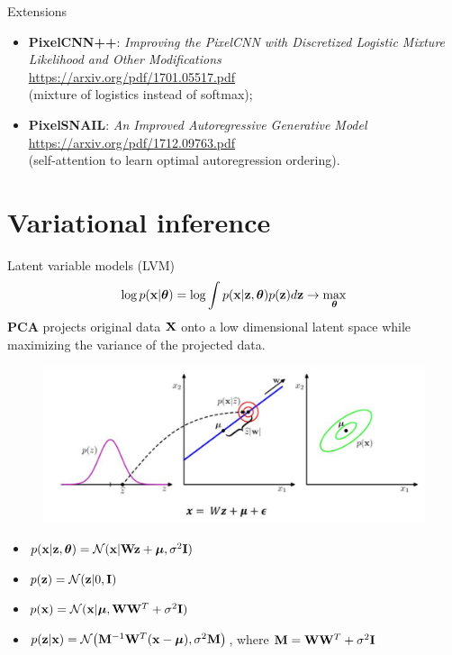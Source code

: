 \documentclass{beamer}
\begin{document}
\begin{frame}{Extensions}
\begin{itemize}
	\item \textbf{PixelCNN++}: \textit{Improving the PixelCNN with Discretized Logistic Mixture Likelihood and Other Modifications} \\
	\href{https://arxiv.org/pdf/1701.05517.pdf}{https://arxiv.org/pdf/1701.05517.pdf} \\
	(mixture of logistics instead of softmax);
	\item \textbf{PixelSNAIL}: \textit{An Improved Autoregressive Generative Model} \\
	\href{https://arxiv.org/pdf/1712.09763.pdf}{https://arxiv.org/pdf/1712.09763.pdf} \\
	(self-attention to learn optimal autoregression ordering).
\end{itemize}
\end{frame}
\section{Variational inference}
\begin{frame}{Latent variable models (LVM)}
	\[
	\log p(\mathbf{x} | \boldsymbol{\theta}) = \log \int p(\mathbf{x} | \mathbf{z}, \boldsymbol{\theta}) p(\mathbf{z}) d\mathbf{z} \rightarrow \max_{\boldsymbol{\theta}}
	\]
	\textbf{PCA} projects original data $\mathbf{X}$ onto a low dimensional latent space while maximizing the variance of the projected data. 
	\begin{figure}
		\centering
		\includegraphics[width=.7\linewidth]{figs/bayesian_pca}
	\end{figure}
	\vspace{-0.5cm}
	\begin{itemize}
		\item $p(\mathbf{x} | \mathbf{z}, \boldsymbol{\theta}) = \mathcal{N}(\mathbf{x} | \mathbf{W} \mathbf{z} + \boldsymbol{\mu}, \sigma^2 \mathbf{I})$
		\item $p(\mathbf{z}) = \mathcal{N}(\mathbf{z} | 0, \mathbf{I})$
		\item $p(\mathbf{x}) = \mathcal{N}(\mathbf{x} | \boldsymbol{\mu}, \mathbf{W} \mathbf{W}^T + \sigma^2 \mathbf{I})$
		\item $p(\mathbf{z} | \mathbf{x}) = \mathcal{N} \bigl(\mathbf{M}^{-1} \mathbf{W}^T (\mathbf{x} - \boldsymbol{\mu}), \sigma^2 \mathbf{M}\bigr)$, where $\mathbf{M} = \mathbf{W} \mathbf{W}^T + \sigma^2 \mathbf{I}$
	\end{itemize}
\end{frame}
\end{document}
